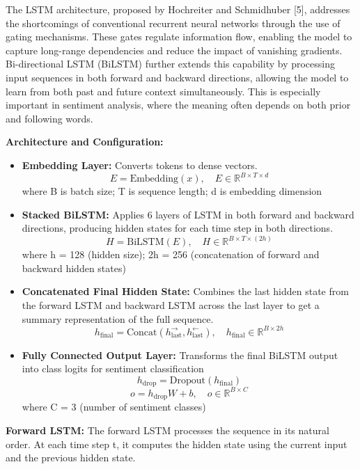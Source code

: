 \documentclass{article}
\begin{document}
The LSTM architecture, proposed by Hochreiter and Schmidhuber [5], addresses the shortcomings of conventional recurrent neural networks through the use of gating mechanisms. These gates regulate information flow, enabling the model to capture long-range dependencies and reduce the impact of vanishing gradients. Bi-directional LSTM (BiLSTM) further extends this capability by processing input sequences in both forward and backward directions, allowing the model to learn from both past and future context simultaneously. This is especially important in sentiment analysis, where the meaning often depends on both prior and following words.

\textbf{Architecture and Configuration:}

\begin{itemize}
\item \textbf{Embedding Layer:}  Converts tokens to dense vectors.
\[
E = \text{Embedding}(x), \quad E \in \mathbb{R}^{B \times T \times d}
\]
where B is batch size; T is sequence length; d is embedding dimension
\item \textbf{Stacked BiLSTM:} Applies 6 layers of LSTM in both forward and backward directions, producing hidden states for each time step in both directions.
\[
H = \text{BiLSTM}(E), \quad H \in \mathbb{R}^{B \times T \times (2h)}
\]
where h = 128 (hidden size); 2h = 256 (concatenation of forward and backward hidden states)

\item \textbf{Concatenated Final Hidden State:} Combines the last hidden state from the forward LSTM and backward LSTM across the last layer to get a summary representation of the full sequence.
\[
h_{\text{final}} = \text{Concat}(h^{\rightarrow}_{\text{last}}, h^{\leftarrow}_{\text{last}}), \quad h_{\text{final}} \in \mathbb{R}^{B \times 2h}
\]

\item \textbf{Fully Connected Output Layer:} Transforms the final BiLSTM output into class logits for sentiment classification
\[
h_{\text{drop}} = \text{Dropout}(h_{\text{final}})
\]
\[
o = h_{\text{drop}}W + b, \quad o \in \mathbb{R}^{B \times C}
\]
where C = 3 (number of sentiment classes)
\end{itemize}


\textbf{Forward LSTM:}
The forward LSTM processes the sequence in its natural order. At each time step t, it computes the hidden state using the current input and the previous hidden state.
\end{document}
